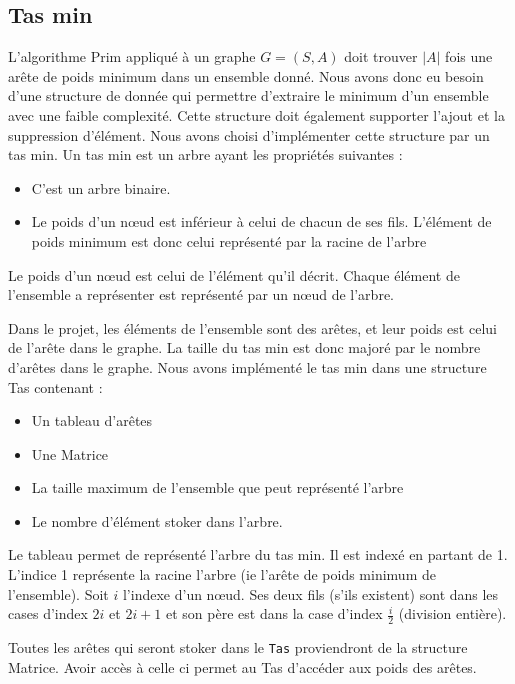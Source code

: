 \documentclass[a4paper,11pt]{article}
\begin{document}
\subsection{Tas min} %
L'algorithme Prim appliqué à un graphe $G = (S, A)$ doit trouver $|A|$ fois une arête de poids minimum dans un ensemble donné.
Nous avons donc eu besoin d'une structure de donnée qui permettre d'extraire le minimum d'un ensemble avec une faible complexité. Cette structure doit également supporter l'ajout et la suppression d'élément.
Nous avons choisi d'implémenter cette structure par un tas min.
Un tas min est un arbre ayant les propriétés suivantes :
\begin{itemize}
\item C'est un arbre binaire.
\item Le poids d'un nœud est inférieur à celui de chacun de ses fils. L'élément de poids minimum est donc celui représenté par la racine de l'arbre
\end{itemize}
Le poids d'un nœud est celui de l'élément qu'il décrit.
Chaque élément de l'ensemble a représenter est représenté par un nœud de l'arbre.

Dans le projet, les éléments de l'ensemble sont des arêtes, et leur poids est celui de l’arête dans le graphe. La taille du tas min est donc majoré par le nombre d’arêtes dans le graphe.
Nous avons implémenté le tas min dans une structure \textsf{Tas} contenant :
\begin{itemize}
\renewcommand{\FrenchLabelItem}{\textbullet}
\item Un tableau d’arêtes
\item Une \textsf{Matrice}
\item La taille maximum de l'ensemble que peut représenté l'arbre
\item Le nombre d'élément stoker dans l'arbre.
\end{itemize}
Le tableau permet de représenté l'arbre du tas min. Il est indexé en partant de 1.
L'indice 1 représente la racine l'arbre (ie l’arête de poids minimum de l'ensemble).
Soit $i$ l'indexe d'un nœud. Ses deux fils (s'ils existent) sont dans les cases d'index $2i$ et $2i +1$ et son père est dans la case d'index $\frac{i}{2}$ (division entière).

Toutes les arêtes qui seront stoker dans le \texttt{Tas} proviendront de la structure \textsf{Matrice}. Avoir accès à celle ci permet au \textsf{Tas} d'accéder aux poids des arêtes.
\end{document}
